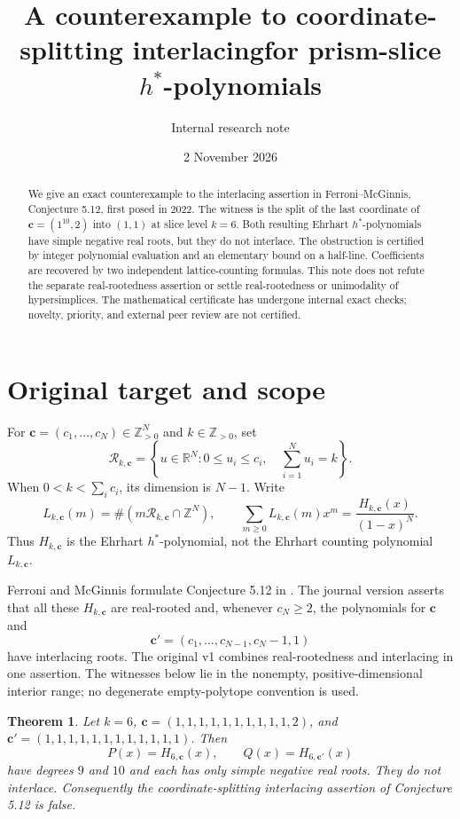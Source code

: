 \documentclass[11pt]{article}
\title{A counterexample to coordinate-splitting interlacing\newline for prism-slice $h^*$-polynomials}
\author{Internal research note}
\date{2 November 2026}
\newtheorem{theorem}{Theorem}
\newcommand{\ZZ}{\mathbb Z}
\newcommand{\RR}{\mathbb R}
\newcommand{\Rpoly}{\mathcal R}
\begin{document}
\maketitle
\begin{abstract}
We give an exact counterexample to the interlacing assertion in Ferroni--McGinnis, Conjecture 5.12, first posed in 2022. The witness is the split of the last coordinate of $\mathbf c=(1^{10},2)$ into $(1,1)$ at slice level $k=6$. Both resulting Ehrhart $h^*$-polynomials have simple negative real roots, but they do not interlace. The obstruction is certified by integer polynomial evaluation and an elementary bound on a half-line. Coefficients are recovered by two independent lattice-counting formulas. This note does not refute the separate real-rootedness assertion or settle real-rootedness or unimodality of hypersimplices. The mathematical certificate has undergone internal exact checks; novelty, priority, and external peer review are not certified.
\end{abstract}

\section{Original target and scope}
For $\mathbf c=(c_1,\ldots,c_N)\in\ZZ_{>0}^N$ and $k\in\ZZ_{>0}$, set
\[
\Rpoly_{k,\mathbf c}=\left\{u\in\RR^N:0\le u_i\le c_i,\quad\sum_{i=1}^N u_i=k\right\}.
\]
When $0<k<\sum_i c_i$, its dimension is $N-1$. Write
\[
L_{k,\mathbf c}(m)=\#(m\Rpoly_{k,\mathbf c}\cap\ZZ^N),\qquad
\sum_{m\ge0}L_{k,\mathbf c}(m)x^m=\frac{H_{k,\mathbf c}(x)}{(1-x)^N}.
\]
Thus $H_{k,\mathbf c}$ is the Ehrhart $h^*$-polynomial, not the Ehrhart counting polynomial $L_{k,\mathbf c}$.

Ferroni and McGinnis formulate Conjecture 5.12 in \cite{FM1,FM2,FMJ}. The journal version asserts that all these $H_{k,\mathbf c}$ are real-rooted and, whenever $c_N\ge2$, the polynomials for $\mathbf c$ and
\[
\mathbf c'=(c_1,\ldots,c_{N-1},c_N-1,1)
\]
have interlacing roots. The original v1 combines real-rootedness and interlacing in one assertion. The witnesses below lie in the nonempty, positive-dimensional interior range; no degenerate empty-polytope convention is used.

\begin{theorem}\label{thm:main}
Let $k=6$, $\mathbf c=(1,1,1,1,1,1,1,1,1,1,2)$, and $\mathbf c'=(1,1,1,1,1,1,1,1,1,1,1,1)$. Then
\[
P(x)=H_{6,\mathbf c}(x),\qquad Q(x)=H_{6,\mathbf c'}(x)
\]
have degrees $9$ and $10$ and each has only simple negative real roots. They do not interlace. Consequently the coordinate-splitting interlacing assertion of Conjecture 5.12 is false.
\end{theorem}
\end{document}
